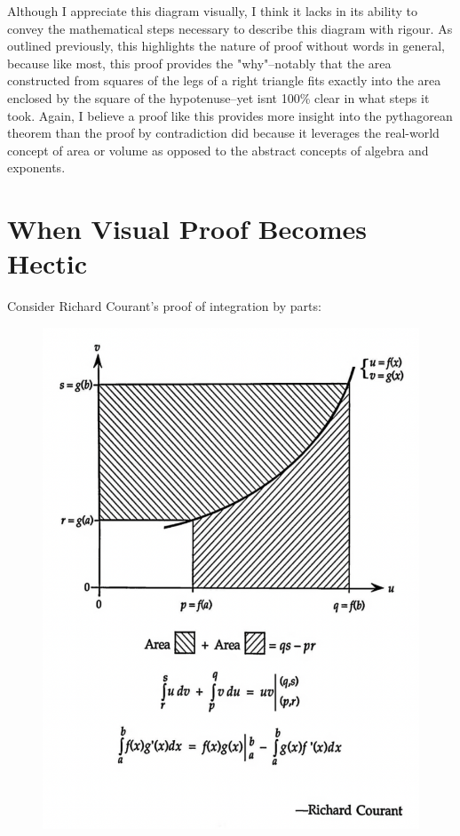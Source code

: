 \documentclass[11pt,a4paper]{article}
\begin{document}
Although I appreciate this diagram visually, I think it lacks in its ability to convey the mathematical steps necessary to describe this diagram with rigour. As outlined previously, this highlights the nature of proof without words in general, because like most, this proof provides the "why"--notably that the area constructed from squares of the legs of a right triangle fits exactly into the area enclosed by the square of the hypotenuse--yet isnt 100\% clear in what steps it took. Again, I believe a proof like this provides more insight into the pythagorean theorem than the proof by contradiction did because it leverages the real-world concept of area or volume as opposed to the abstract concepts of algebra and exponents.

\pagebreak
\section{When Visual Proof Becomes Hectic}

Consider Richard Courant's proof of integration by parts: 

\begin{figure}[h]
\begin{center}
\includegraphics[scale=.5]{proof of ibp} 
\end{center}
\end{figure}
\end{document}
